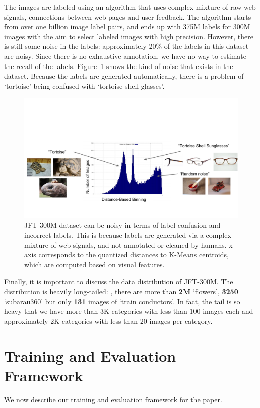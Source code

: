 \documentclass[10pt,twocolumn,letterpaper]{article}
\begin{document}
The images are labeled using an algorithm that uses complex mixture of raw web signals, connections between web-pages and user feedback. The algorithm starts from over one billion image label pairs, and ends up with 375M labels for 300M images with the aim to select labeled images with high precision. However, there is still some noise in the labels: approximately 20\% of the labels in this dataset are noisy. Since there is no exhaustive annotation, we have no way to estimate the recall of the labels. Figure~\ref{fig:noise} shows the kind of noise that exists in the dataset. Because the labels are generated automatically, there is a problem of `tortoise' being confused with `tortoise-shell glasses'.

\begin{figure}
\center
\includegraphics[width=\columnwidth]{Noise}
\caption{JFT-300M dataset can be noisy in terms of label confusion and incorrect labels. This is because labels are generated via a complex mixture of web signals, and not annotated or cleaned by humans. x-axis corresponds to the quantized distances to K-Means centroids, which are computed based on visual features.}
\label{fig:noise}
\end{figure}

Finally, it is important to discuss the data distribution of JFT-300M. The distribution is heavily long-tailed: \eg, there are more than {\bf 2M} `flowers', {\bf 3250} `subarau360' but only {\bf 131} images of `train conductors'. In fact, the tail is so heavy that we have more than 3K categories with less than 100 images each and approximately 2K categories with less than 20 images per category. 

\section{Training and Evaluation Framework}
We now describe our training and evaluation framework for the paper.
\end{document}
